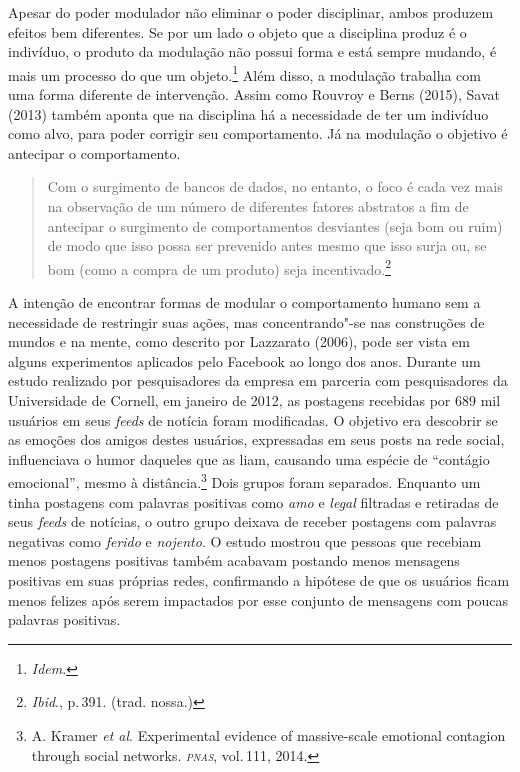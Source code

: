 Apesar do poder modulador não eliminar o poder disciplinar, ambos
produzem efeitos bem diferentes. Se por um lado o objeto que a
disciplina produz é o indivíduo, o produto da modulação não possui forma
e está sempre mudando, é mais um processo do que um objeto.\footnote{\textit{Idem}.}
Além disso, a modulação trabalha com uma forma diferente de
intervenção. Assim como Rouvroy e Berns (2015), Savat (2013) também
aponta que na disciplina há a necessidade de ter um indivíduo como alvo,
para poder corrigir seu comportamento. Já na modulação o objetivo é
antecipar o comportamento.

\begin{quote}
Com o surgimento de bancos de dados, no entanto, o foco é cada vez mais
na observação de um número de diferentes fatores abstratos a fim de
antecipar o surgimento de comportamentos desviantes (seja bom ou ruim)
de modo que isso possa ser prevenido antes mesmo que isso surja ou, se
bom (como a compra de um produto) seja incentivado.\footnote{\textit{Ibid}., p.\,391. (trad. nossa.)}
\end{quote}

A intenção de encontrar formas de modular o comportamento humano sem a
necessidade de restringir suas ações, mas concentrando"-se nas
construções de mundos e na mente, como descrito por Lazzarato (2006),
pode ser vista em alguns experimentos aplicados pelo Facebook ao longo
dos anos. Durante um estudo realizado por pesquisadores da empresa em
parceria com pesquisadores da Universidade de Cornell, em janeiro de
2012, as postagens recebidas por 689 mil usuários em seus \textit{feeds} de notícia
foram modificadas. O objetivo era descobrir se as emoções dos amigos
destes usuários, expressadas em seus posts na rede social, influenciava
o humor daqueles que as liam, causando uma espécie de ``contágio
emocional'', mesmo à distância.\footnote{A. Kramer \textit{et al}. Experimental evidence of massive-scale emotional contagion through social networks. \textit{\textsc{pnas}}, vol.\,111, 2014.} Dois
grupos foram separados. Enquanto um tinha postagens com palavras
positivas como \textit{amo} e \textit{legal} filtradas e retiradas de seus \textit{feeds}
de notícias, o outro grupo deixava de receber postagens com palavras negativas
como \textit{ferido} e \textit{nojento}. O estudo mostrou que pessoas que recebiam
menos postagens positivas também acabavam postando menos mensagens
positivas em suas próprias redes, confirmando a hipótese de que os
usuários ficam menos felizes após serem impactados por esse conjunto de
mensagens com poucas palavras positivas.


